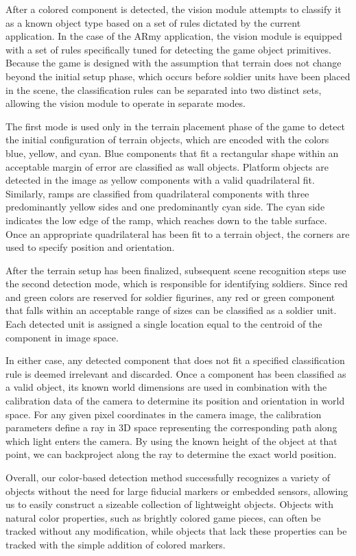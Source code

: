 \documentclass{thesis}
\begin{document}
After a colored component is detected, the vision module attempts to classify it as a known object type based on a set of rules dictated by the current application. In the case of the ARmy application, the vision module is equipped with a set of rules specifically tuned for detecting the game object primitives. Because the game is designed with the assumption that terrain does not change beyond the initial setup phase, which occurs before soldier units have been placed in the scene, the classification rules can be separated into two distinct sets, allowing the vision module to operate in separate modes. 

The first mode is used only in the terrain placement phase of the game to detect the initial configuration of terrain objects, which are encoded with the colors blue, yellow, and cyan. Blue components that fit a rectangular shape within an acceptable margin of error are classified as wall objects. Platform objects are detected in the image as yellow components with a valid quadrilateral fit. Similarly, ramps are classified from quadrilateral components with three predominantly yellow sides and one predominantly cyan side. The cyan side indicates the low edge of the ramp, which reaches down to the table surface. Once an appropriate quadrilateral has been fit to a terrain object, the corners are used to specify position and orientation.

After the terrain setup has been finalized, subsequent scene recognition steps use the second detection mode, which is responsible for identifying soldiers. Since red and green colors are reserved for soldier figurines, any red or green component that falls within an acceptable range of sizes can be classified as a soldier unit. Each detected unit is assigned a single location equal to the centroid of the component in image space.

In either case, any detected component that does not fit a specified classification rule is deemed irrelevant and discarded. Once a component has been classified as a valid object, its known world dimensions are used in combination with the calibration data of the camera to determine its position and orientation in world space. For any given pixel coordinates in the camera image, the calibration parameters define a ray in 3D space representing the corresponding path along which light enters the camera. By using the known height of the object at that point, we can backproject along the ray to determine the exact world position.

Overall, our color-based detection method successfully recognizes a variety of objects without the need for large fiducial markers or embedded sensors, allowing us to easily construct a sizeable collection of lightweight objects. Objects with natural color properties, such as brightly colored game pieces, can often be tracked without any modification, while objects that lack these properties can be tracked with the simple addition of colored markers.
\end{document}
